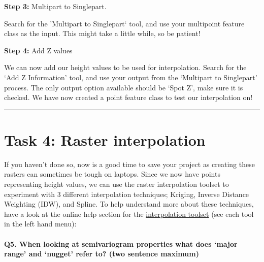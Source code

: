 \documentclass[
]{book}
\begin{document}
\textbf{Step 3:} Multipart to Singlepart.

Search for the 'Multipart to Singlepart` tool, and use your multipoint feature class as the input. This might take a little while, so be patient!

\textbf{Step 4:} Add Z values

We can now add our height values to be used for interpolation. Search for the `Add Z Information' tool, and use your output from the `Multipart to Singlepart' process. The only output option available should be `Spot Z', make sure it is checked. We have now created a point feature class to test our interpolation on!

\begin{center}\rule{0.5\linewidth}{0.5pt}\end{center}

\hypertarget{task-4-raster-interpolation}{%
\section*{Task 4: Raster interpolation}\label{task-4-raster-interpolation}}

If you haven't done so, now is a good time to save your project as creating these rasters can sometimes be tough on laptops. Since we now have points representing height values, we can use the raster interpolation toolset to experiment with 3 different interpolation techniques; Kriging, Inverse Distance Weighting (IDW), and Spline. To help understand more about these techniques, have a look at the online help section for the \href{https://pro.arcgis.com/en/pro-app/tool-reference/spatial-analyst/an-overview-of-the-interpolation-tools.htm}{interpolation toolset} (see each tool in the left hand menu):

\hypertarget{q5.-when-looking-at-semivariogram-properties-what-does-major-range-and-nugget-refer-to-two-sentence-maximum}{%
\paragraph*{Q5. When looking at semivariogram properties what does `major range' and `nugget' refer to? (two sentence maximum)}\label{q5.-when-looking-at-semivariogram-properties-what-does-major-range-and-nugget-refer-to-two-sentence-maximum}}
\end{document}
